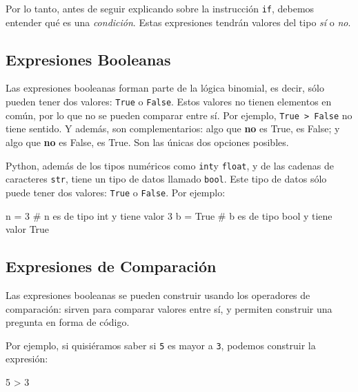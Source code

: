 \documentclass[
  letterpaper,
  DIV=11,
  numbers=noendperiod]{scrreprt}
\newenvironment{Shaded}{\begin{snugshade}}{\end{snugshade}}
\newcommand{\CommentTok}[1]{\textcolor[rgb]{0.37,0.37,0.37}{#1}}
\newcommand{\DecValTok}[1]{\textcolor[rgb]{0.68,0.00,0.00}{#1}}
\newcommand{\NormalTok}[1]{\textcolor[rgb]{0.00,0.23,0.31}{#1}}
\newcommand{\OperatorTok}[1]{\textcolor[rgb]{0.37,0.37,0.37}{#1}}
\newcommand{\VariableTok}[1]{\textcolor[rgb]{0.07,0.07,0.07}{#1}}
\begin{document}
Por lo tanto, antes de seguir explicando sobre la instrucción
\texttt{if}, debemos entender qué es una \emph{condición}. Estas
expresiones tendrán valores del tipo \emph{sí} o \emph{no}.

\hypertarget{expresiones-booleanas}{%
\subsection{Expresiones Booleanas}\label{expresiones-booleanas}}

Las expresiones booleanas forman parte de la lógica binomial, es decir,
sólo pueden tener dos valores: \texttt{True} o \texttt{False}. Estos
valores no tienen elementos en común, por lo que no se pueden comparar
entre sí. Por ejemplo, \texttt{True\ \textgreater{}\ False} no tiene
sentido. Y además, son complementarios: algo que \textbf{no} es True, es
False; y algo que \textbf{no} es False, es True. Son las únicas dos
opciones posibles.

Python, además de los tipos numéricos como \texttt{int}y \texttt{float},
y de las cadenas de caracteres \texttt{str}, tiene un tipo de datos
llamado \texttt{bool}. Este tipo de datos sólo puede tener dos valores:
\texttt{True} o \texttt{False}. Por ejemplo:

\begin{Shaded}
\begin{Highlighting}[]
\NormalTok{n }\OperatorTok{=} \DecValTok{3} \CommentTok{\# n es de tipo \textquotesingle{}int\textquotesingle{} y tiene valor 3}
\NormalTok{b }\OperatorTok{=} \VariableTok{True} \CommentTok{\# b es de tipo \textquotesingle{}bool\textquotesingle{} y tiene valor True}
\end{Highlighting}
\end{Shaded}

\hypertarget{expresiones-de-comparaciuxf3n}{%
\subsection{Expresiones de
Comparación}\label{expresiones-de-comparaciuxf3n}}

Las expresiones booleanas se pueden construir usando los operadores de
comparación: sirven para comparar valores entre sí, y permiten construir
una pregunta en forma de código.

Por ejemplo, si quisiéramos saber si \texttt{5} es mayor a \texttt{3},
podemos construir la expresión:

\begin{Shaded}
\begin{Highlighting}[]
\DecValTok{5} \OperatorTok{\textgreater{}} \DecValTok{3}
\end{Highlighting}
\end{Shaded}
\end{document}
